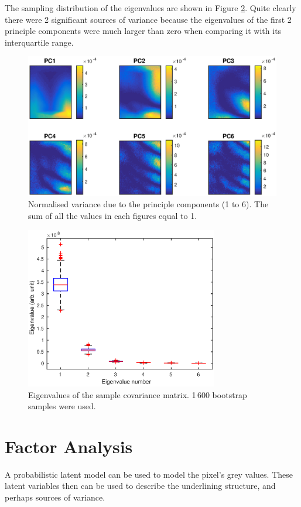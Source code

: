 \documentclass[12pt]{report}
\begin{document}
The sampling distribution of the eigenvalues are shown in Figure \ref{fig:initial_PC_eigenvalues}. Quite clearly there were 2 significant sources of variance because the eigenvalues of the first 2 principle components were much larger than zero when comparing it with its interquartile range.

\begin{figure}
	\includegraphics[width=\textwidth]{figures/initial_PCvariance.eps}
	\caption{Normalised variance due to the principle components (1 to 6). The sum of all the values in each figures equal to 1.}
	\label{fig:initial_PCvariance}
\end{figure}

\begin{figure}
	\centering
	\includegraphics[width=0.75\textwidth]{figures/initial_PC_eigenvalues.eps}
	\caption{Eigenvalues of the sample covariance matrix. 1\,600 bootstrap samples were used.}
	\label{fig:initial_PC_eigenvalues}
\end{figure}

\section{Factor Analysis}
A probabilistic latent model can be used to model the pixel's grey values. These latent variables then can be used to describe the underlining structure, and perhaps sources of variance.
\end{document}
